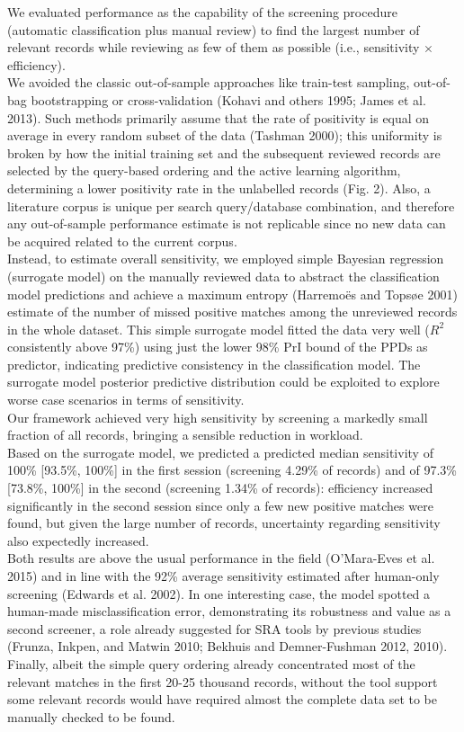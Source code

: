 \documentclass{article}
\begin{document}
We evaluated performance as the capability of the screening procedure
(automatic classification plus manual review) to find the largest number
of relevant records while reviewing as few of them as possible (i.e.,
sensitivity \(\times\) efficiency).\\
We avoided the classic out-of-sample approaches like train-test
sampling, out-of-bag bootstrapping or cross-validation (Kohavi and
others 1995; James et al. 2013). Such methods primarily assume that the
rate of positivity is equal on average in every random subset of the
data (Tashman 2000); this uniformity is broken by how the initial
training set and the subsequent reviewed records are selected by the
query-based ordering and the active learning algorithm, determining a
lower positivity rate in the unlabelled records (Fig. 2). Also, a
literature corpus is unique per search query/database combination, and
therefore any out-of-sample performance estimate is not replicable since
no new data can be acquired related to the current corpus.\\
Instead, to estimate overall sensitivity, we employed simple Bayesian
regression (surrogate model) on the manually reviewed data to abstract
the classification model predictions and achieve a maximum entropy
(Harremoës and Topsøe 2001) estimate of the number of missed positive
matches among the unreviewed records in the whole dataset. This simple
surrogate model fitted the data very well (\(R^2\) consistently above
97\%) using just the lower 98\% PrI bound of the PPDs as predictor,
indicating predictive consistency in the classification model. The
surrogate model posterior predictive distribution could be exploited to
explore worse case scenarios in terms of sensitivity.\\

Our framework achieved very high sensitivity by screening a markedly
small fraction of all records, bringing a sensible reduction in
workload.\\
Based on the surrogate model, we predicted a predicted median
sensitivity of 100\% {[}93.5\%, 100\%{]} in the first session (screening
4.29\% of records) and of 97.3\% {[}73.8\%, 100\%{]} in the second
(screening 1.34\% of records): efficiency increased significantly in the
second session since only a few new positive matches were found, but
given the large number of records, uncertainty regarding sensitivity
also expectedly increased.\\
Both results are above the usual performance in the field (O'Mara-Eves
et al. 2015) and in line with the 92\% average sensitivity estimated
after human-only screening (Edwards et al. 2002). In one interesting
case, the model spotted a human-made misclassification error,
demonstrating its robustness and value as a second screener, a role
already suggested for SRA tools by previous studies (Frunza, Inkpen, and
Matwin 2010; Bekhuis and Demner-Fushman 2012, 2010). Finally, albeit the
simple query ordering already concentrated most of the relevant matches
in the first 20-25 thousand records, without the tool support some
relevant records would have required almost the complete data set to be
manually checked to be found.\\
\end{document}
